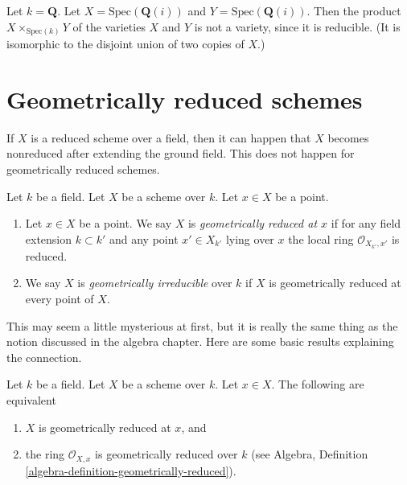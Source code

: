 \begin{example}
\label{example-product-not-a-variety}
Let $k = \mathbf{Q}$. Let $X = \text{Spec}(\mathbf{Q}(i))$
and $Y = \text{Spec}(\mathbf{Q}(i))$. Then the product
$X \times_{\text{Spec}(k)} Y$ of the varieties $X$ and $Y$
is not a variety, since it is reducible. (It is isomorphic
to the disjoint union of two copies of $X$.)
\end{example}







\section{Geometrically reduced schemes}
\label{section-geometrically-reduced}

\noindent
If $X$ is a reduced scheme over a field, then it can happen that $X$
becomes nonreduced after extending the ground field. This does not happen
for geometrically reduced schemes.

\begin{definition}
\label{definition-geometrically-reduced}
Let $k$ be a field.
Let $X$ be a scheme over $k$.
Let $x \in X$ be a point.
\begin{enumerate}
\item Let $x \in X$ be a point.
We say $X$ is {\it geometrically reduced at $x$}
if for any field extension $k \subset k'$
and any point $x' \in X_{k'}$ lying over $x$
the local ring $\mathcal{O}_{X_{k'}, x'}$ is reduced.
\item We say $X$ is {\it geometrically irreducible} over $k$
if $X$ is geometrically reduced at every point of $X$.
\end{enumerate}
\end{definition}

\noindent
This may seem a little mysterious at first, but it is
really the same thing as the notion discussed in the algebra chapter.
Here are some basic results explaining the connection.

\begin{lemma}
\label{lemma-geometrically-reduced-at-point}
Let $k$ be a field.
Let $X$ be a scheme over $k$.
Let $x \in X$.
The following are equivalent
\begin{enumerate}
\item $X$ is geometrically reduced at $x$, and
\item the ring $\mathcal{O}_{X, x}$ is geometrically
reduced over $k$ (see
Algebra, Definition \ref{algebra-definition-geometrically-reduced}).
\end{enumerate}
\end{lemma}

